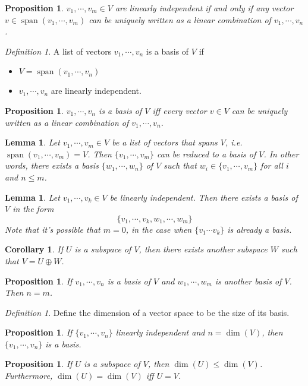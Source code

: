 \documentclass[12pt]{amsart}
\renewcommand{\leq}{\leqslant}
\DeclareMathOperator{\s}{span}
\newtheorem{lemma}[theorem]{Lemma}
\newtheorem{proposition}[theorem]{Proposition}
\newtheorem{corollary}[theorem]{Corollary}
\theoremstyle{remark}
\newtheorem{definition}[theorem]{Definition}
\numberwithin{equation}{section}
\begin{document}
\begin{proposition}
	$v_1,\cdots,v_m\in V$ are \emph{linearly independent} if and only if any vector $v\in \s(v_1,\cdots,v_m)$ can be uniquely written as a linear combination of $v_1,\cdots,v_n$.
\end{proposition}
\begin{definition}
	A list of vectors $v_1,\cdots,v_n$ is a basis of $V$ if
	\begin{itemize}
		\item $V=\s(v_1,\cdots,v_n)$
		\item $v_1,\cdots,v_n$ are linearly independent.
	\end{itemize}
\end{definition}
\begin{proposition}
	$v_1,\cdots,v_n$ is a basis of $V$ iff every vector $v\in V$ can be uniquely written as a linear combination of $v_1,\cdots,v_n$.
\end{proposition}
\begin{lemma}Let $v_1,\cdots,v_m\in V$ be a list of vectors that spans $V$, i.e. $\s (v_1,\cdots,v_m)=V$. Then $\{v_1,\cdots,v_m\}$ can be reduced to  a basis of $V$. In other words, there exists a basis $\{w_1,\cdots,w_n\}$ of $V$ such that $w_i\in \{v_1,\cdots,v_m\}$ for all $i$ and $n\leq m$.
\end{lemma}
\begin{lemma}
	Let $v_1,\cdots,v_k\in V$ be linearly independent. Then there exists a basis of $V$ in the form
	\[\{v_1,\cdots,v_k,w_1,\cdots,w_m\}\]
	Note that it's possible that $m=0$, in the case when $\{v_1\cdots v_k\}$ is already a basis.
\end{lemma}
\begin{corollary}
	If $U$ is a subspace of $V$, then there exists another subspace $W$ such that $V=U\oplus W$.
\end{corollary}
\begin{proposition}
	If $v_1,\cdots,v_n$ is a basis of $V$ and $w_1,\cdots,w_m$ is another basis of $V$. Then $n=m$.
\end{proposition}
\begin{definition}
	Define the dimension of a vector space to be the size of its basis.
\end{definition}
\begin{proposition}
	If $\{v_1,\cdots,v_n\}$ linearly independent and $n=\dim(V)$, then $\{v_1,\cdots,v_n\}$ is a basis.
\end{proposition}
\begin{proposition}
	If $U$ is a subspace of $V$, then $\dim(U)\leq \dim(V)$. Furthermore, $\dim(U)=\dim(V)$ iff $U=V$.
\end{proposition}
\end{document}
